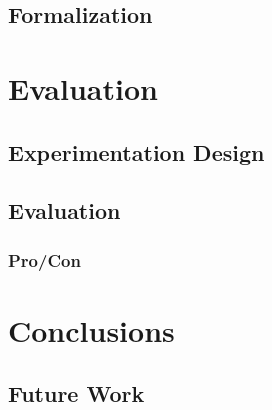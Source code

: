 \documentclass[10pt,a4paper]{article}
\begin{document}
\subsection{Formalization}

\section{Evaluation}

\subsection{Experimentation Design}

\subsection{Evaluation}

\subsubsection{Pro/Con}

\section{Conclusions}

\subsection{Future Work}



	
\end{document}
